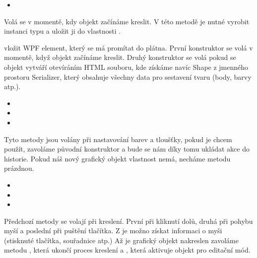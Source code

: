 \documentclass[
  field=inf,
  biblatex,
  glossaries,
  index
]{kidiplom}
\begin{document}
\begin{itemize}
\item {}
\end{itemize}
Volá se v momentě, kdy objekt začínáme kreslit. V této metodě je nutné vyrobit instanci typu  a uložit ji do vlastnosti .



vložit WPF element, který se má promítat do plátna. První konstruktor se volá v momentě, když objekt začínáme kreslit. Druhý konstruktor se volá pokud se objekt vytváří otevíráním HTML souboru, kde získáme navíc Shape z jmenného prostoru Serializer, který obsahuje všechny data pro sestavení tvaru (body, barvy atp.).

\begin{itemize}
\item {}
\item {}
\item {}
\end{itemize}
Tyto metody jsou volány při nastavování barev a tloušťky, pokud je chcem použít, zavoláme původní konstruktor  a bude se nám díky tomu ukládat akce do historie. Pokud náš nový grafický objekt vlastnost nemá, necháme metodu prázdnou.

\begin{itemize}
\item {}
\item {}
\item {}
\end{itemize}
Předchozí metody se volají při kreslení. První při kliknutí dolů, druhá při pohybu myší a poslední při puštění tlačítka. Z  je možno získat informaci o myši (stisknuté tlačítka, souřadnice atp.) Až je grafický objekt nakreslen zavoláme metodu , která ukončí proces kreslení a , která aktivuje objekt pro editační mód.
\end{document}
